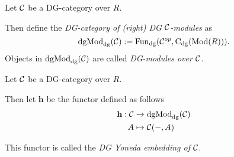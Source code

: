 \begin{definition}[\( \dgMod_{\dg}(\Cc) \)]
    Let \( {\mathcal{C}} \) be a DG-category over \( R \).

    Then define the \emph{DG-category of (right) DG \( {\mathcal{C}} \)-modules} as
    \[
        \operatorname{dgMod}_{\operatorname{dg}}({\mathcal{C}}) := \operatorname{Fun}_{\operatorname{dg}}({\mathcal{C}}^{op}, \operatorname{C}_{\operatorname{dg}}(\operatorname{Mod}(R))).
    \]
    Objects in \( \dgMod_{\dg}(\Cc) \) are called \emph{DG-modules over \( {\mathcal{C}} \)}.

    
\end{definition}

\begin{definition}
    \label{def:DG_Yoneda_embedding}
    Let \( {\mathcal{C}} \) be a DG-category over \( R \).
    
    Then let \( \mathbf{h} \) be the functor defined as follows
    \begin{align*}
        \mathbf{h}: {\mathcal{C}} &\to \operatorname{dgMod}_{\operatorname{dg}}({\mathcal{C}}) \\
        A &\mapsto {\mathcal{C}}(-, A)
    \end{align*}

    This functor is called the \emph{DG Yoneda embedding of \( {\mathcal{C}} \)}.
\end{definition}


